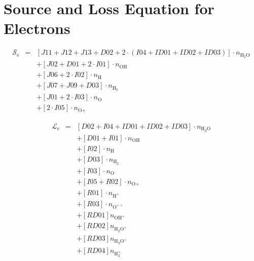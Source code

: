 \documentclass[12pt, letterpaper]{article}
\begin{document}
\section{Source and Loss Equation for Electrons}
\begin{eqnarray}
\mathcal{S}_{\text{e}} & = & \left[ J11 + J12 + J13 + D02 + 2 \cdot \left( I04 + ID01 + ID02 + ID03 \right) \right] \cdot n_{\text{H}_{2}\text{O}} \nonumber \\
& & + \left[ J02 + D01 + 2 \cdot I01 \right] \cdot n_{\text{OH}} \nonumber \\
& & + \left[ J06 + 2 \cdot I02 \right] \cdot n_{\text{H}} \nonumber \\
& & + \left[ J07 + J09 + D03 \right] \cdot n_{\text{H}_{2}} \nonumber \\
& & + \left[ J01 + 2 \cdot I03 \right] \cdot n_{\text{O}} \nonumber \\
& & + \left[ 2 \cdot I05 \right] \cdot n_{\text{O+}}
\end{eqnarray}

\begin{eqnarray}
\mathcal{L}_{\text{e}} & = & \left[ D02 + I04 + ID01 + ID02 + ID03 \right] \cdot n_{\text{H}_{2}\text{O}} \nonumber \\
& & + \left[ D01 + I01 \right] \cdot n_{\text{OH}} \nonumber \\
& & + \left[ I02 \right] \cdot n_{\text{H}} \nonumber \\
& & + \left[ D03 \right] \cdot n_{\text{H}_{2}} \nonumber \\
& & + \left[ I03 \right] \cdot n_{\text{O}} \nonumber \\
& & + \left[ I05 + R02 \right] \cdot n_{\text{O+}} \nonumber \\
& & + \left[ R01 \right] \cdot n_{\text{H}^{+}} \nonumber \\
& & + \left[ R03 \right] \cdot n_{\text{O}^{++}} \nonumber \\
& & + \left[ RD01 \right] n_{\text{OH}^{+}} \nonumber \\ 
& & + \left[ RD02 \right] n_{\text{H}_{2}\text{O}^{+}} \nonumber \\
& & + \left[ RD03 \right] n_{\text{H}_{3}\text{O}^{+}} \nonumber \\
& & + \left[ RD04 \right] n_{\text{H}_{2}^{+}} \nonumber \\
\end{eqnarray}


\newpage


\end{document}
